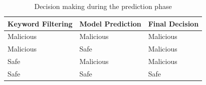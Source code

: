 \begin{table}
  \caption{Decision making during the prediction phase}
  \label{tab:decisionmaking}
  \centering
  \begin{tabular}{lll}
    \toprule
    Keyword Filtering & Model Prediction & Final Decision  \\
    \midrule
    Malicious      & Malicious      & Malicious     \\
    Malicious      & Safe      & Malicious     \\
    Safe      & Malicious      & Malicious     \\
    Safe      & Safe      & Safe     \\
    \bottomrule
  \end{tabular}
\end{table}